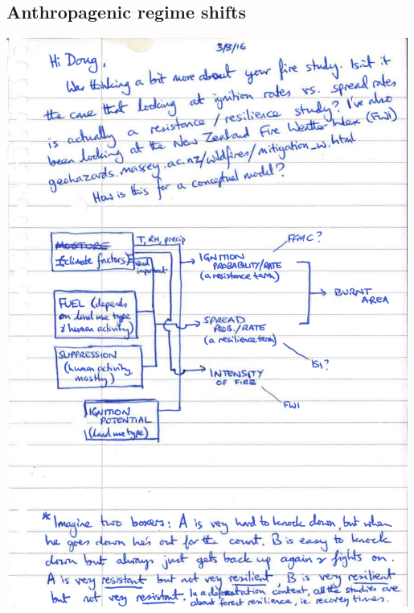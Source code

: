 \documentclass[12pt]{article}
\begin{document}
\subsection{Anthropagenic regime shifts}
\includegraphics[width=0.99\textwidth]{tobys_notes.pdf}



\end{document}
